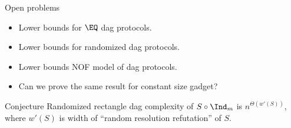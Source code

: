 \begin{frame}{Open problems}

    \begin{itemize}
        \item Lower bounds for $\EQ$ dag protocols.
        \item Lower bounds for randomized dag protocols.
        \item Lower bounds NOF model of dag protocols.
        \item Can we prove the same result for constant size gadget?
    \end{itemize}

    \begin{block}{Conjecture}
        Randomized rectangle dag complexity of $S \circ \Ind_{m}$ is $n^{\Theta(w'(S))}$, where $w'(S)$ is
        width of ``random resolution refutation'' of $S$.
    \end{block}
\end{frame}